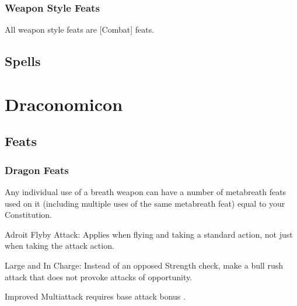 \subsubsection{Weapon Style Feats}
All weapon style feats are [Combat] feats.
\subsection{Spells}
\section{Draconomicon}
\subsection{Feats}
\subsubsection{Dragon Feats}
Any individual use of a breath weapon can have a number of metabreath feats used on it (including multiple uses of the same metabreath feat) equal to your Constitution.
\begin{itemize*}
\item Adroit Flyby Attack: Applies when flying and taking a standard action, not just when taking the attack action.
\item Large and In Charge: Instead of an opposed Strength check, make a bull rush attack that does not provoke attacks of opportunity.
\item Improved Multiattack requires base attack bonus .
\end{itemize*}
